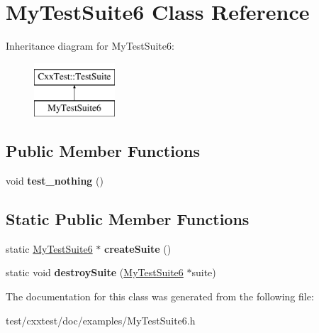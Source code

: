 \hypertarget{classMyTestSuite6}{\section{My\-Test\-Suite6 Class Reference}
\label{classMyTestSuite6}
}
Inheritance diagram for My\-Test\-Suite6\-:\begin{figure}[H]
\begin{center}
\leavevmode
\includegraphics[height=2.000000cm]{classMyTestSuite6}
\end{center}
\end{figure}
\subsection*{Public Member Functions}
\begin{DoxyCompactItemize}
\item 
\hypertarget{classMyTestSuite6_aad9b995dcfda90809922c46d1c36498f}{void {\bfseries test\-\_\-nothing} ()}\label{classMyTestSuite6_aad9b995dcfda90809922c46d1c36498f}

\end{DoxyCompactItemize}
\subsection*{Static Public Member Functions}
\begin{DoxyCompactItemize}
\item 
\hypertarget{classMyTestSuite6_a02ef5681272e10856057dd5cc301f269}{static \hyperlink{classMyTestSuite6}{My\-Test\-Suite6} $\ast$ {\bfseries create\-Suite} ()}\label{classMyTestSuite6_a02ef5681272e10856057dd5cc301f269}

\item 
\hypertarget{classMyTestSuite6_af72c13a463bf380ce2147b22ce353ddd}{static void {\bfseries destroy\-Suite} (\hyperlink{classMyTestSuite6}{My\-Test\-Suite6} $\ast$suite)}\label{classMyTestSuite6_af72c13a463bf380ce2147b22ce353ddd}

\end{DoxyCompactItemize}


The documentation for this class was generated from the following file\-:\begin{DoxyCompactItemize}
\item 
test/cxxtest/doc/examples/My\-Test\-Suite6.\-h\end{DoxyCompactItemize}
